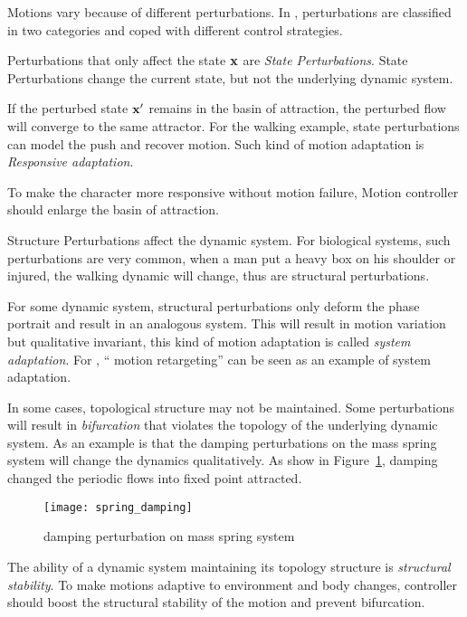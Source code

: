 Motions vary because of different perturbations.
In \moit, perturbations are classified in two categories and coped with different control strategies.

\begin{itemize}

Perturbations that only affect the state $\mathbf{x}$ are \emph{State Perturbations}.
State Perturbations change the current state, but not the underlying dynamic system.


If the perturbed state $\mathbf{x}'$ remains in the basin of attraction, the perturbed flow will converge to the same attractor. 
For the walking example, state perturbations can model the push and recover motion.
Such kind of motion adaptation is \emph{Responsive adaptation}.


To make the character more responsive without motion failure,
Motion controller should enlarge the basin of attraction.






Structure Perturbations affect the dynamic system.
For biological systems,  such perturbations are very common, when a man put a heavy box on his shoulder or injured, the walking dynamic will change, thus are structural perturbations.


For some dynamic system,
structural perturbations only deform the phase portrait and result in an analogous system.
This will result in motion variation but qualitative invariant, this kind of motion adaptation is called \emph{system adaptation}.
For \cms, `` motion retargeting'' can be seen as an example of system adaptation.

In some cases, topological structure may not be maintained.
Some perturbations will result in \emph{bifurcation} that violates the topology of the underlying dynamic system.
As an  example is that the damping perturbations on the mass spring system will change the dynamics qualitatively.
As show in Figure~\ref{fig:dampmass}, damping changed the periodic flows into fixed point attracted.

\begin{figure}
\begin{center}
\texttt{[image: spring\_damping]}
\end{center}
\caption{damping perturbation on mass spring system}
\label{fig:dampmass}
\end{figure}

The ability of a dynamic system maintaining its topology structure is \emph{structural stability}.
To make motions adaptive to environment and body changes, controller should boost the structural stability of the motion and prevent bifurcation.
\end{itemize}

